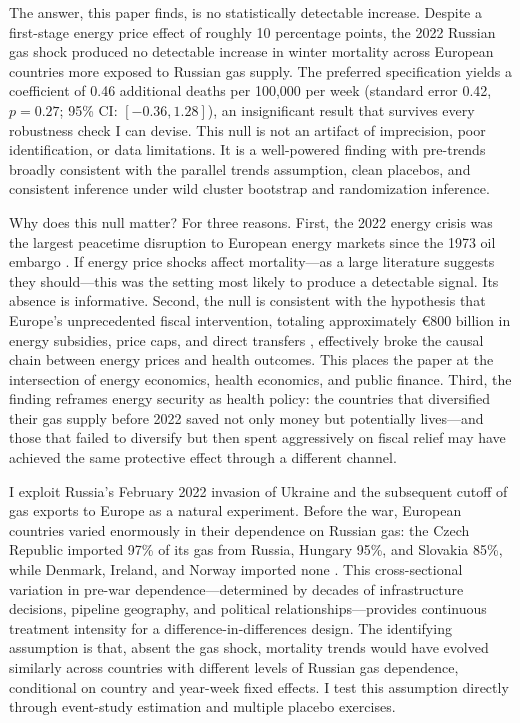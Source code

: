 \documentclass[12pt]{article}
\begin{document}
The answer, this paper finds, is no statistically detectable increase. Despite a first-stage energy price effect of roughly 10 percentage points, the 2022 Russian gas shock produced no detectable increase in winter mortality across European countries more exposed to Russian gas supply. The preferred specification yields a coefficient of 0.46 additional deaths per 100,000 per week (standard error 0.42, $p = 0.27$; 95\% CI: $[-0.36, 1.28]$), an insignificant result that survives every robustness check I can devise. This null is not an artifact of imprecision, poor identification, or data limitations. It is a well-powered finding with pre-trends broadly consistent with the parallel trends assumption, clean placebos, and consistent inference under wild cluster bootstrap and randomization inference.

Why does this null matter? For three reasons. First, the 2022 energy crisis was the largest peacetime disruption to European energy markets since the 1973 oil embargo \citep{hamilton2003, kilian2009}. If energy price shocks affect mortality---as a large literature suggests they should---this was the setting most likely to produce a detectable signal. Its absence is informative. Second, the null is consistent with the hypothesis that Europe's unprecedented fiscal intervention, totaling approximately \euro 800 billion in energy subsidies, price caps, and direct transfers \citep{bruegel2023, mcwilliams2024}, effectively broke the causal chain between energy prices and health outcomes. This places the paper at the intersection of energy economics, health economics, and public finance. Third, the finding reframes energy security as health policy: the countries that diversified their gas supply before 2022 saved not only money but potentially lives---and those that failed to diversify but then spent aggressively on fiscal relief may have achieved the same protective effect through a different channel.

I exploit Russia's February 2022 invasion of Ukraine and the subsequent cutoff of gas exports to Europe as a natural experiment. Before the war, European countries varied enormously in their dependence on Russian gas: the Czech Republic imported 97\% of its gas from Russia, Hungary 95\%, and Slovakia 85\%, while Denmark, Ireland, and Norway imported none \citep{iea2022, stern2022}. This cross-sectional variation in pre-war dependence---determined by decades of infrastructure decisions, pipeline geography, and political relationships---provides continuous treatment intensity for a difference-in-differences design. The identifying assumption is that, absent the gas shock, mortality trends would have evolved similarly across countries with different levels of Russian gas dependence, conditional on country and year-week fixed effects. I test this assumption directly through event-study estimation and multiple placebo exercises.
\end{document}
